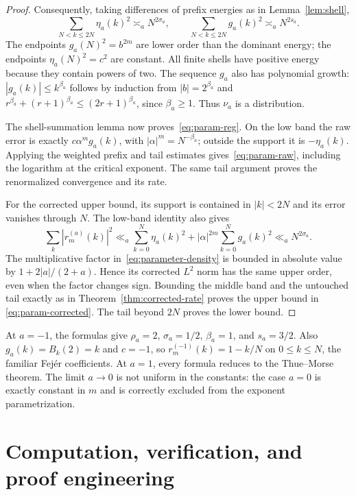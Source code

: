 \documentclass[11pt,a4paper]{article}
\numberwithin{equation}{section}
\theoremstyle{definition}
\theoremstyle{remark}
\begin{document}
\begin{proof}
Consequently, taking differences of prefix energies as in
Lemma~\ref{lem:shell},
\[
 \sum_{N<k\le2N}\eta_a(k)^2\asymp_a N^{2\sigma_a},\qquad
 \sum_{N<k\le2N}g_a(k)^2\asymp_a N^{2s_a}.
\]
The endpoints $g_a(N)^2=b^{2m}$ are lower order than the dominant energy;
the endpoints $\eta_a(N)^2=c^2$ are constant. All finite shells have positive
energy because they contain powers of two. The sequence $g_a$ also has
polynomial growth: $|g_a(k)|\le k^{\beta_a}$ follows by induction from
$|b|=2^{\beta_a}$ and
$r^{\beta_a}+(r+1)^{\beta_a}\le(2r+1)^{\beta_a}$, since $\beta_a\ge1$.
Thus $\nu_a$ is a distribution.

The shell-summation lemma now proves~\eqref{eq:param-reg}. On the low band the
raw error is exactly $c\alpha^mg_a(k)$, with
$|\alpha|^m=N^{-\beta_a}$; outside the support it is $-\eta_a(k)$. Applying
the weighted prefix and tail estimates gives~\eqref{eq:param-raw}, including
the logarithm at the critical exponent. The same tail argument proves the
renormalized convergence and its rate.

For the corrected upper bound, its support is contained in $|k|<2N$ and its
error vanishes through $N$. The low-band identity also gives
\[
 \sum_k|r_m^{(a)}(k)|^2
 \ll_a \sum_{k=0}^{N}\eta_a(k)^2+
        |\alpha|^{2m}\sum_{k=0}^{N}g_a(k)^2
 \ll_a N^{2\sigma_a}.
\]
The multiplicative factor in~\eqref{eq:parameter-density} is bounded in absolute
value by $1+2|a|/(2+a)$. Hence its corrected $L^2$ norm has the same upper order,
even when the factor changes sign. Bounding the middle band and the untouched
tail exactly as in Theorem~\ref{thm:corrected-rate} proves the upper bound in
\eqref{eq:param-corrected}. The tail beyond $2N$ proves the lower bound.
\end{proof}

At $a=-1$, the formulas give $\rho_a=2$, $\sigma_a=1/2$, $\beta_a=1$, and
$s_a=3/2$. Also $g_a(k)=B_k(2)=k$ and $c=-1$, so
$r_m^{(-1)}(k)=1-k/N$ on $0\le k\le N$, the familiar Fej\'er coefficients.
At $a=1$, every formula reduces to the Thue--Morse theorem. The limit $a\to0$
is not uniform in the constants: the case $a=0$ is exactly constant in $m$ and
is correctly excluded from the exponent parametrization.

\section{Computation, verification, and proof engineering}
\label{sec:computation}
\end{document}
